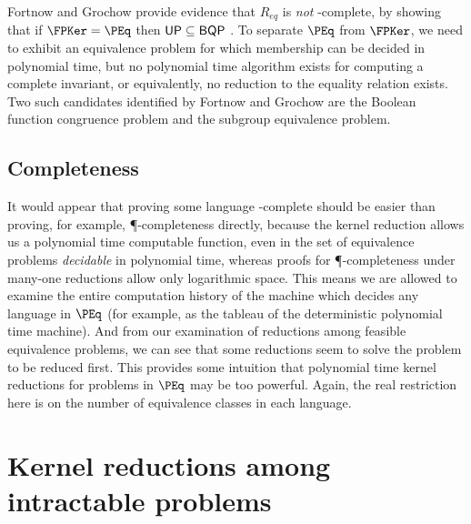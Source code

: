 \documentclass{article}
\theoremstyle{definition} \newtheorem{definition}[definition]{Definition}
\begin{document}
Fortnow and Grochow provide evidence that $R_{eq}$ is \emph{not} \PEq-complete,
by showing that if $\FPKer=\PEq$ then ${\mathsf{UP}}\subseteq{\ensuremath{\mathsf{BQP}}}$ \cite{fg09}. To
separate $\PEq$ from $\FPKer$, we need to exhibit an equivalence problem for
which membership can be decided in polynomial time, but no polynomial time
algorithm exists for computing a complete invariant, or equivalently, no
reduction to the equality relation exists. Two such candidates identified by
Fortnow and Grochow are the Boolean function congruence problem and the
subgroup equivalence problem.


\subsection{Completeness}

It would appear that proving some language \PEq-complete should be easier than
proving, for example, \P-completeness directly, because the kernel reduction
allows us a polynomial time computable function, even in the set of equivalence
problems \emph{decidable} in polynomial time, whereas proofs for
\P-completeness under many-one reductions allow only logarithmic space. This
means we are allowed to examine the entire computation history of the machine
which decides any language in $\PEq$ (for example, as the tableau of the
deterministic polynomial time machine). And from our examination of reductions
among feasible equivalence problems, we can see that some reductions seem to
solve the problem to be reduced first. This provides some intuition that
polynomial time kernel reductions for problems in $\PEq$ may be too
powerful. Again, the real restriction here is on the number of equivalence
classes in each language.



\section{Kernel reductions among intractable problems} \label{sec:np}
\end{document}
